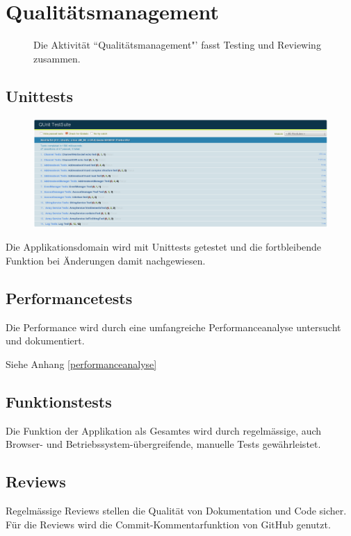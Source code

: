 \chapter{Qualitätsmanagement}
	\begin{figure}[H]
		\centering
		{\tiny
		}
		\caption{Die Aktivität ``Qualitätsmanagement"' fasst Testing und Reviewing
		zusammen.}
	\end{figure}


	\section{Unittests}		
		\begin{figure}[H]
			\centering
			\includegraphics[width=1\textwidth]{../qualityManagement/unittesting.png}
			\label{unittests}
		\end{figure}
		Die Applikationsdomain wird mit Unittests getestet und die fortbleibende
		Funktion bei Änderungen damit nachgewiesen.
		
	\section{Performancetests}
		Die Performance wird durch eine umfangreiche Performanceanalyse untersucht und dokumentiert.
		
		Siehe Anhang \ref{performanceanalyse}
		
	\section{Funktionstests}
		Die Funktion der Applikation als Gesamtes wird durch regelmässige, auch
		Browser- und Betriebssystem-übergreifende, manuelle Tests gewährleistet.
		
	\section{Reviews}
		Regelmässige Reviews stellen die Qualität von Dokumentation und Code sicher. Für die Reviews wird die Commit-Kommentarfunktion von GitHub genutzt.
